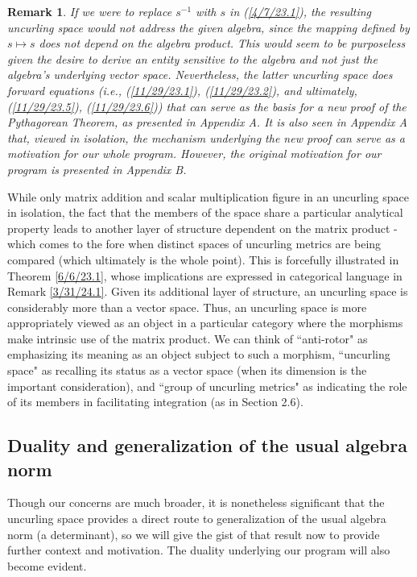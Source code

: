 \documentclass{amsart}
\numberwithin{equation}{section}
\newtheorem{remark}[theorem]{Remark}
\theoremstyle{definition}
\numberwithin{theorem}{section}
\begin{document}
 
\begin{remark}\label{11/21/23.1} {\rm If we were to replace $s^{-1}$ with $s$ in (\ref{4/7/23.1}), the resulting uncurling space would not address the given algebra, since the mapping defined by $s\mapsto s$ does not depend on the algebra product.  This would seem to be purposeless given the desire to derive an entity sensitive to the algebra and not just the algebra's underlying vector space.  Nevertheless, the latter uncurling space does forward equations (i.e., (\ref{11/29/23.1}), (\ref{11/29/23.2}), and ultimately, (\ref{11/29/23.5}), (\ref{11/29/23.6})) that can serve as the basis for a new proof of the Pythagorean Theorem, as presented in Appendix A.  It is also seen in Appendix A that, viewed in isolation, the mechanism underlying the new proof can serve as a motivation for our whole program.  However, the original motivation for our program is presented in Appendix B.  }\end{remark}
 
While only matrix addition and scalar multiplication figure in an uncurling space in isolation, the fact that the members of the space share a particular analytical property leads to another layer of structure dependent on the matrix product - which comes to the fore when distinct spaces of uncurling metrics are being compared (which ultimately is the whole point).  This is forcefully illustrated in Theorem \ref{6/6/23.1}, whose implications are expressed in categorical language in Remark \ref{3/31/24.1}. Given its additional layer of structure, an uncurling space is considerably more than a vector space.  Thus, an uncurling space is more appropriately viewed as an object in a particular category where the morphisms make intrinsic use of the matrix product.    
We can think of  ``anti-rotor" as emphasizing its meaning as an object subject to such a morphism, ``uncurling space" as recalling its status as a vector space (when its dimension is the important consideration), and ``group of uncurling metrics" as indicating the role of its members in facilitating integration (as in Section 2.6).
 

 
  \subsection{Duality and generalization of the usual algebra norm}
    Though our concerns are much broader, it is nonetheless significant that the uncurling space provides a direct route to generalization of the usual algebra norm (a determinant), so we will give the gist of that result now to provide further context and motivation.  The duality underlying our program will also become evident.
 
\end{document}
